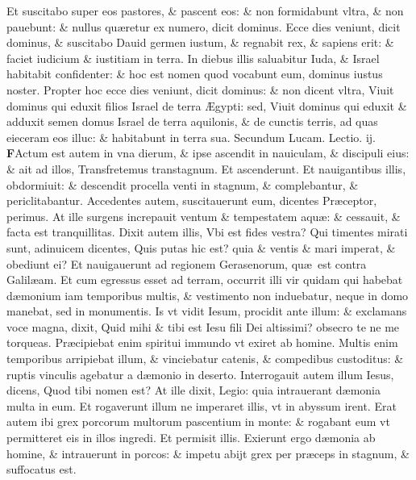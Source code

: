 \documentclass[a5paper,10pt]{book}
\def\leftmarginnote{%
	\lrmarginnote{\hskip -\marginparsep \hskip -6.5em}}
\def\ae{æ}
\def\AE{Æ}
\begin{document}
\begin{multicols*}{2}
Et suscitabo super eos pastores, \& pascent eos: \& non formidabunt vltra, \& non pauebunt: \& nullus qu\ae retur ex numero, dicit dominus.
Ecce dies veniunt, dicit dominus, \& suscitabo Dauid germen iustum, \& regnabit rex, \& sapiens erit: \& faciet iudicium \& iustitiam in terra.
In diebus illis saluabitur Iuda, \& Israel habitabit confidenter: \& hoc est nomen quod vocabunt eum, dominus iustus noster.
Propter hoc ecce dies veniunt, dicit dominus: \& non dicent vltra, Viuit dominus qui eduxit filios Israel de terra \AE gypti: sed, Viuit dominus qui eduxit \& adduxit semen domus Israel de terra aquilonis, \& de cunctis terris, ad quas eieceram eos illuc: \& habitabunt in terra sua.
\newline \color{red} Secundum Lucam. \hfill Lectio. ij. \color{black}
\vspace{-.25em}
\lettrine[lines=2]{\bfseries \color{red} F}{}Actum\leftmarginnote{\begin{flushright}ca. 8.\end{flushright}} est autem in vna dierum, \& ipse ascendit in nauiculam, \& discipuli eius: \& ait ad illos, Transfretemus transtagnum.
Et ascenderunt. Et nauigantibus illis, obdormiuit: \& descendit procella venti in stagnum, \& complebantur, \& periclitabantur.
Accedentes autem, suscitauerunt eum, dicentes Pr\ae ceptor, perimus.
At ille surgens increpauit ventum \& tempestatem aqu\ae : \& cessauit, \& facta est tranquillitas.
Dixit autem illis, Vbi est fides vestra? Qui timentes mirati sunt, adinuicem dicentes, Quis putas hic est? quia \& ventis \& mari imperat, \& obediunt ei?
Et nauigauerunt ad regionem Gerasenorum, qu\ae \ est contra Galil\ae am.
Et cum egressus esset ad terram, occurrit illi vir quidam qui habebat d\ae monium iam temporibus multis, \& vestimento non induebatur, neque in domo manebat, sed in monumentis.
Is vt vidit Iesum, procidit ante illum: \& exclamans voce magna, dixit, Quid mihi \& tibi est Iesu fili Dei altissimi? obsecro te ne me torqueas.
Pr\ae cipiebat enim spiritui immundo vt exiret ab homine.
Multis enim temporibus arripiebat illum, \& vinciebatur catenis, \& compedibus custoditus: \& ruptis vinculis agebatur a d\ae monio in deserto.
Interrogauit autem illum Iesus, dicens, Quod tibi nomen est? At ille dixit, Legio: quia intrauerant d\ae monia multa in eum.
Et rogaverunt illum ne imperaret illis, vt in abyssum irent.
Erat autem ibi grex porcorum multorum pascentium in monte: \& rogabant eum vt permitteret eis in illos ingredi.
Et permisit illis. Exierunt ergo d\ae monia ab homine, \& intrauerunt in porcos: \& impetu abijt grex per pr\ae ceps in stagnum, \& suffocatus est.

\end{multicols*}
\end{document}
